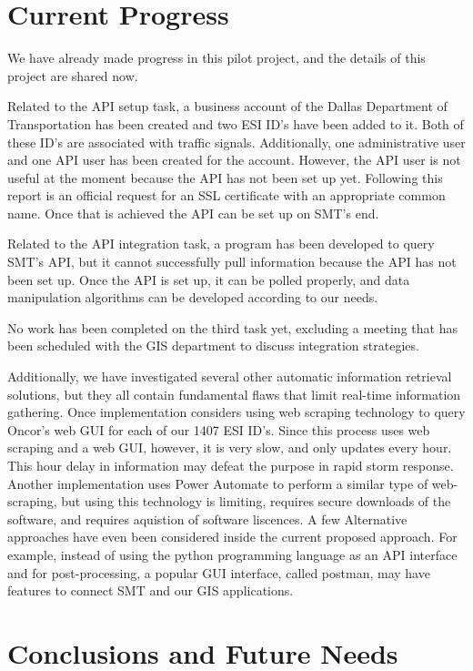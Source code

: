 \documentclass[letterpaper, notitlepage]{report}
\begin{document}
\section{Current Progress}
We have already made progress in this pilot project, and the details of this project are shared now.

Related to the API setup task, a business account of the Dallas Department of Transportation has been created and two ESI ID's have been added to it. Both of these ID's are associated with traffic signals. Additionally, one administrative user and one API user has been created for the account. However, the API user is not useful at the moment because the API has not been set up yet. Following this report is an official request for an SSL certificate with an appropriate common name. Once that is achieved the API can be set up on SMT's end. 

Related to the API integration task, a program has been developed to query SMT's API, but it cannot successfully pull information because the API has not been set up. Once the API is set up, it can be polled properly, and data manipulation algorithms can be developed according to our needs.

No work has been completed on the third task yet, excluding a meeting that has been scheduled with the GIS department to discuss integration strategies. 

Additionally, we have investigated several other automatic information retrieval solutions, but they all contain fundamental flaws that limit real-time information gathering. Once implementation considers using web scraping technology to query Oncor's web GUI for each of our 1407 ESI ID's. Since this process uses web scraping and a web GUI, however, it is very slow, and only updates every hour. This hour delay in information may defeat the purpose in rapid storm response. Another implementation uses Power Automate to perform a similar type of web-scraping, but using this technology is limiting, requires secure downloads of the software, and requires aquistion of software liscences. A few Alternative approaches have even been considered inside the current proposed approach. For example, instead of using the python programming language as an API interface and for post-processing, a popular GUI interface, called postman, may have features to connect SMT and our GIS applications.

\section{Conclusions and Future Needs}
\end{document}
